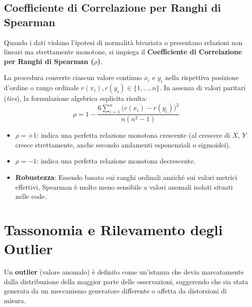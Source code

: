 \FloatBarrier
\subsection{Coefficiente di Correlazione per Ranghi di Spearman}

Quando i dati violano l'ipotesi di normalità bivariata o presentano relazioni non lineari ma strettamente monotone, si impiega il \textbf{Coefficiente di Correlazione per Ranghi di Spearman ($\rho$)}.

La procedura converte ciascun valore continuo $x_i$ e $y_i$ nella rispettiva posizione d'ordine o rango ordinale $r(x_i), r(y_i) \in \{1, \dots, n\}$. In assenza di valori paritari (\textit{ties}), la formulazione algebrica esplicita risulta:
\begin{equation}
    \rho = 1 - \frac{6 \sum_{i=1}^n \big(r(x_i) - r(y_i)\big)^2}{n(n^2 - 1)}
\end{equation}

\begin{itemize}[noitemsep]
    \item $\rho = +1$: indica una perfetta relazione monotona crescente (al crescere di $X$, $Y$ cresce strettamente, anche secondo andamenti esponenziali o sigmoidei).
    \item $\rho = -1$: indica una perfetta relazione monotona decrescente.
    \item \textbf{Robustezza}: Essendo basato sui ranghi ordinali anziché sui valori metrici effettivi, Spearman è molto meno sensibile a valori anomali isolati situati nelle code.
\end{itemize}

\FloatBarrier
\section{Tassonomia e Rilevamento degli Outlier}
\label{sec:dm-outlier-detection-taxonomy}

Un \textbf{outlier} (valore anomalo) è definito come un'istanza che devia marcatamente dalla distribuzione della maggior parte delle osservazioni, suggerendo che sia stata generata da un meccanismo generatore differente o affetta da distorsioni di misura.

\FloatBarrier
